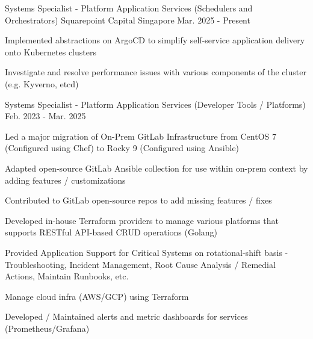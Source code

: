 

\begin{cventries}

  \cventry
    {Systems Specialist - Platform Application Services (Schedulers and Orchestrators)} %
    {Squarepoint Capital} %
    {Singapore} %
    {Mar. 2025 - Present} %
    {
      \begin{cvitems} %
        \item {Implemented abstractions on ArgoCD to simplify self-service application delivery onto Kubernetes clusters}
        \item {Investigate and resolve performance issues with various components of the cluster (e.g. Kyverno, etcd)}
      \end{cvitems}
    }

  \cventry
    {Systems Specialist - Platform Application Services (Developer Tools / Platforms)} %
    {Feb. 2023 - Mar. 2025} %
    {
      \begin{cvitems} %
        \item {Led a major migration of On-Prem GitLab Infrastructure from CentOS 7 (Configured using Chef) to Rocky 9 (Configured using Ansible)}
        \item {Adapted open-source GitLab Ansible collection for use within on-prem context by adding features / customizations}
        \item {Contributed to GitLab open-source repos to add missing features / fixes}
        \item {Developed in-house Terraform providers to manage various platforms that supports RESTful API-based CRUD operations (Golang)}
        \item {Provided Application Support for Critical Systems on rotational-shift basis - Troubleshooting, Incident Management, Root Cause Analysis / Remedial Actions, Maintain Runbooks, etc.}
        \item {Manage cloud infra (AWS/GCP) using Terraform}
        \item {Developed / Maintained alerts and metric dashboards for services (Prometheus/Grafana)}
      \end{cvitems}
    }


\end{cventries}

